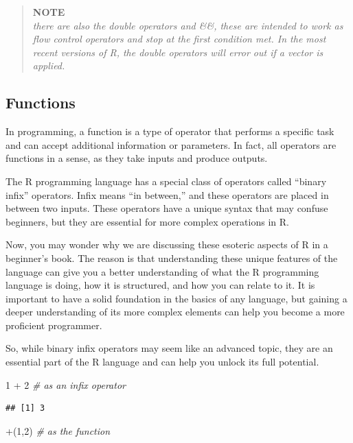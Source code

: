 \documentclass[
]{book}
\newenvironment{Shaded}{\begin{snugshade}}{\end{snugshade}}
\newcommand{\AttributeTok}[1]{\textcolor[rgb]{0.77,0.63,0.00}{#1}}
\newcommand{\CommentTok}[1]{\textcolor[rgb]{0.56,0.35,0.01}{\textit{#1}}}
\newcommand{\DecValTok}[1]{\textcolor[rgb]{0.00,0.00,0.81}{#1}}
\newcommand{\NormalTok}[1]{#1}
\newcommand{\SpecialCharTok}[1]{\textcolor[rgb]{0.00,0.00,0.00}{#1}}
\newcommand{\StringTok}[1]{\textcolor[rgb]{0.31,0.60,0.02}{#1}}
\begin{document}
\begin{quote}
\textbf{NOTE}\\
\emph{there are also the double operators \textbar\textbar{} and \&\&, these are intended to work as flow control operators and stop at the first condition met. In the most recent versions of R, the double operators will error out if a vector is applied.}
\end{quote}

\hypertarget{functions}{%
\subsection{Functions}\label{functions}}

In programming, a function is a type of operator that performs a specific task and can accept additional information or parameters. In fact, all operators are functions in a sense, as they take inputs and produce outputs.

The R programming language has a special class of operators called ``binary infix'' operators. Infix means ``in between,'' and these operators are placed in between two inputs. These operators have a unique syntax that may confuse beginners, but they are essential for more complex operations in R.

Now, you may wonder why we are discussing these esoteric aspects of R in a beginner's book. The reason is that understanding these unique features of the language can give you a better understanding of what the R programming language is doing, how it is structured, and how you can relate to it. It is important to have a solid foundation in the basics of any language, but gaining a deeper understanding of its more complex elements can help you become a more proficient programmer.

So, while binary infix operators may seem like an advanced topic, they are an essential part of the R language and can help you unlock its full potential.

\begin{Shaded}
\begin{Highlighting}[]
\DecValTok{1} \SpecialCharTok{+} \DecValTok{2}          \CommentTok{\# as an infix operator }
\end{Highlighting}
\end{Shaded}

\begin{verbatim}
## [1] 3
\end{verbatim}

\begin{Shaded}
\begin{Highlighting}[]
\StringTok{\textasciigrave{}}\AttributeTok{+}\StringTok{\textasciigrave{}}\NormalTok{(}\DecValTok{1}\NormalTok{,}\DecValTok{2}\NormalTok{)       }\CommentTok{\# as the function}
\end{Highlighting}
\end{Shaded}
\end{document}
